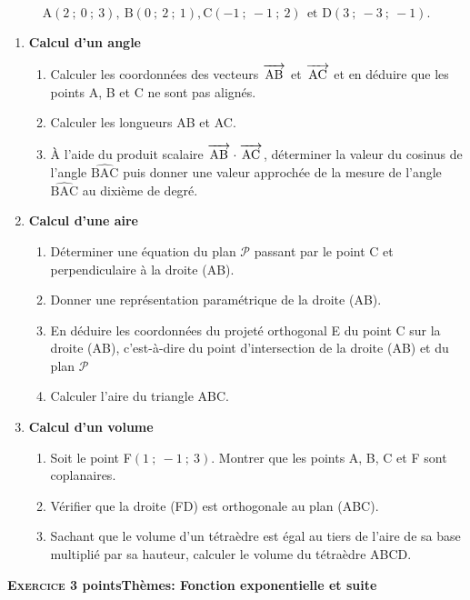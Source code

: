 \documentclass[10pt,a4paper]{article}
\newcommand{\vect}[1]{\overrightarrow{\,\mathstrut#1\,}}
\begin{document}
\[\text{A}(2~;~0~;~3),\: \text{B}(0~;~2~;~1), \text{C}(-1~;~-1~;~2)\:\: \text{et D}(3~;~-3~;~ -1).\]
\smallskip

\begin{enumerate}
\item \textbf{Calcul d'un angle}
	\begin{enumerate}
		\item Calculer les coordonnées des vecteurs $\vect{\text{AB}}$ et $\vect{\text{AC}}$ et en déduire que les points A, B et C ne sont pas alignés.
		\item Calculer les longueurs AB et AC.
		\item À l'aide du produit scalaire $\vect{\text{AB}}\cdot \vect{\text{AC}}$, déterminer la valeur du cosinus de l'angle
$\widehat{\text{BAC}}$ puis donner une valeur approchée de la mesure de l'angle $\widehat{\text{BAC}}$ au dixième de degré.
	\end{enumerate}
\item \textbf{Calcul d'une aire}
	\begin{enumerate}
		\item Déterminer une équation du plan $\mathcal{P}$ passant par le point C et perpendiculaire à la droite (AB).
		\item Donner une représentation paramétrique de la droite (AB).
		\item En déduire les coordonnées du projeté orthogonal E du point C sur la droite
(AB), c'est-à-dire du point d'intersection de la droite (AB) et du plan $\mathcal{P}$
		\item Calculer l'aire du triangle ABC.
	\end{enumerate}
\item \textbf{Calcul d'un volume}
	\begin{enumerate}
		\item Soit le point F$(1~;~-1~;~3)$. Montrer que les points A, B, C et F sont coplanaires.
		\item Vérifier que la droite (FD) est orthogonale au plan (ABC).
		\item Sachant que le volume d'un tétraèdre est égal au tiers de l'aire de sa base
multiplié par sa hauteur, calculer le volume du tétraèdre ABCD.
	\end{enumerate}
\end{enumerate}

\bigskip

\textbf{\textsc{Exercice 3}  points\hfill Thèmes: Fonction exponentielle et suite}
\end{document}
